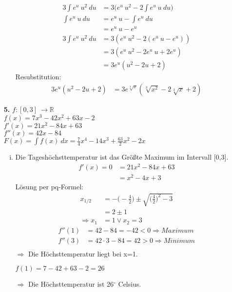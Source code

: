 \documentclass[a4paper]{scrartcl}
\begin{document}
\begin{enumerate}
\begin{enumerate}[(i)]
\begin{align}
3\int e^u\ u^2\ du &=3\Big(e^u\ u^2 - 2\int e^u\ u\ du\Big)\\
\int e^u\ u\ du &=e^u\ u-\int e^u\ du\\
	&=e^u\ u-e^u\\
3\int e^u\ u^2\ du &=3(e^u\ u^2 - 2(e^u\ u-e^u))\\
	 &=3(e^u\ u^2 - 2e^u\ u+2e^u)\\
	 	&=3e^u(u^2-2u+2)
\end{align}
Resubstitution:\\
\begin{align}
3e^u(u^2-2u+2)&=3e^{\sqrt[3]{x}}(\sqrt[3]{x^2}-2\sqrt[3]{x}+2)
\end{align}
\end{enumerate}
\newpage

\item[\textbf{5.}]
\(f:[0,3]\ \rightarrow \mathbb{R}\)\\
\(f(x)=7x^3-42x^2+63x-2\)\\
\(f'(x)=21x^2-84x+63\)\\
\(f''(x)=42x-84\)\\
\(F(x) = \int f(x)\ dx= \frac{7}{4}x^4 -14x^3 +\frac{63}{2}x^2-2x\)\\
\begin{enumerate}[(i)]
\item
Die Tageshöchsttemperatur ist das Größte Maximum im Intervall [0,3].\\
\begin{align}
f'(x)=0&=21x^2-84x+63\\
	&=x^2-4x+3
\end{align}
Lösung per pq-Formel:
\begin{align}
x_{1/2} &=-\Big(-\frac{4}{2}\Big)\pm \sqrt{\Big(\frac{4}{2}\Big)^2 -3} \\
	&=2 \pm 1\\
	\Rightarrow x_1&=1 \vee x_2=3
\end{align}
\begin{align}
f''(1) &= 42-84 = -42<0 \Rightarrow Maximum\\
f''(3) &= 42\cdot 3 - 84 =42>0 \Rightarrow Minimum\\
\end{align}
\(\Rightarrow\) Die Höchsttemperatur liegt bei x=1.
\begin{center}
\(f(1)=7-42+63-2=26\)
\end{center}
\(\Rightarrow\) Die Höchsttemperatur ist 26\(^\circ \) Celsius.\\

\end{enumerate}
\end{enumerate}
\end{document}
